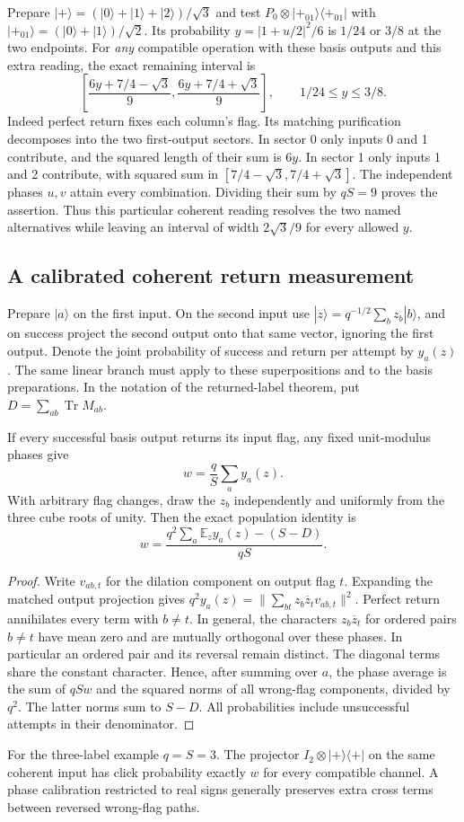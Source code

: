 \documentclass[11pt,letterpaper]{article}
\newcommand{\tr}{\operatorname{Tr}}\newcommand{\ket}[1]{\lvert#1\rangle}\newcommand{\proj}[1]{\ket{#1}\!\langle#1\rvert}
\begin{document}
Prepare $|+\rangle=(|0\rangle+|1\rangle+|2\rangle)/\sqrt3$ and test $P_0\otimes |+_{01}\rangle\langle+_{01}|$ with $|+_{01}\rangle=(|0\rangle+|1\rangle)/\sqrt2$. Its probability $y=|1+u/2|^2/6$ is $1/24$ or $3/8$ at the two endpoints. For \emph{any} compatible operation with these basis outputs and this extra reading, the exact remaining interval is
\[
 \left[\frac{6y+7/4-\sqrt3}{9},\frac{6y+7/4+\sqrt3}{9}\right],
 \qquad 1/24\le y\le3/8.
\]
Indeed perfect return fixes each column's flag. Its matching purification decomposes into the two first-output sectors. In sector 0 only inputs 0 and 1 contribute, and the squared length of their sum is $6y$. In sector 1 only inputs 1 and 2 contribute, with squared sum in $[7/4-\sqrt3,7/4+\sqrt3]$. The independent phases $u,v$ attain every combination. Dividing their sum by $qS=9$ proves the assertion. Thus this particular coherent reading resolves the two named alternatives while leaving an interval of width $2\sqrt3/9$ for every allowed $y$.

\subsection{A calibrated coherent return measurement}
Prepare $|a\rangle$ on the first input. On the second input use $|z\rangle=q^{-1/2}\sum_b z_b|b\rangle$, and on success project the second output onto that same vector, ignoring the first output. Denote the joint probability of success and return per attempt by $y_a(z)$. The same linear branch must apply to these superpositions and to the basis preparations. In the notation of the returned-label theorem, put $D=\sum_{ab}\tr M_{ab}$.
\begin{proposition}
If every successful basis output returns its input flag, any fixed unit-modulus phases give
\[
 w=\frac{q}{S}\sum_a y_a(z).
\]
With arbitrary flag changes, draw the $z_b$ independently and uniformly from the three cube roots of unity. Then the exact population identity is
\[
 w=\frac{q^2\sum_a\mathbb E_z y_a(z)-(S-D)}{qS}.
\]
\end{proposition}
\begin{proof}
Write $v_{ab,t}$ for the dilation component on output flag $t$. Expanding the matched output projection gives $q^2y_a(z)=\|\sum_{bt}z_b\overline z_t v_{ab,t}\|^2$. Perfect return annihilates every term with $b\ne t$. In general, the characters $z_b\overline z_t$ for ordered pairs $b\ne t$ have mean zero and are mutually orthogonal over these phases. In particular an ordered pair and its reversal remain distinct. The diagonal terms share the constant character. Hence, after summing over $a$, the phase average is the sum of $qSw$ and the squared norms of all wrong-flag components, divided by $q^2$. The latter norms sum to $S-D$. All probabilities include unsuccessful attempts in their denominator.
\end{proof}
For the three-label example $q=S=3$. The projector $I_2\otimes|+\rangle\langle+|$ on the same coherent input has click probability exactly $w$ for every compatible channel. A phase calibration restricted to real signs generally preserves extra cross terms between reversed wrong-flag paths.
\end{document}
